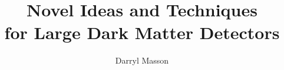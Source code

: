 \documentclass[phys,dissertation,unsrt]{puthesis}
\title{
	Novel Ideas and Techniques \\
	for Large Dark Matter Detectors%
}
\author{Darryl Masson}{Masson, Darryl}
\begin{document}
\volume

















\appendices





%


%
\end{document}
